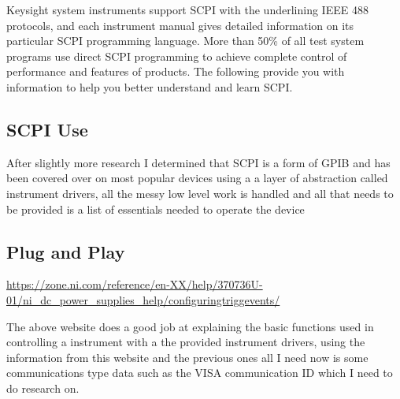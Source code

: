 \documentclass{article}
\begin{document}
Keysight system instruments support SCPI with the underlining IEEE 488 protocols, and each instrument manual gives detailed information on its particular SCPI programming language. More than 50\% of all test system programs use direct SCPI programming to achieve complete control of performance and features of products. The following provide you with information to help you better understand and learn SCPI.

\subsection*{SCPI Use}

After slightly more research I determined that SCPI is a form of GPIB and has been covered over on most popular devices using a a layer of abstraction called instrument drivers, all the messy low level work is handled and all that needs to be provided is a list of essentials needed to operate the device
\newpage
\subsection*{Plug and Play}

\begin{center}
    \url{https://zone.ni.com/reference/en-XX/help/370736U-01/ni_dc_power_supplies_help/configuringtriggevents/}
\end{center}

The above website does a good job at explaining the basic functions used in controlling a instrument with a the provided instrument drivers, using the information from this website and the previous ones all I need now is some communications type data such as the VISA communication ID which I need to do research on.
\newpage
\end{document}
